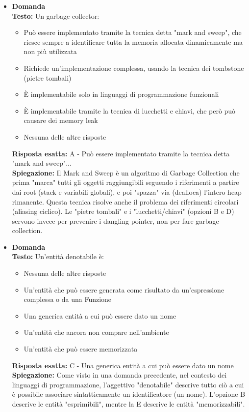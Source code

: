 \documentclass[12pt, a4paper]{article}
\newcounter{domandateoria}
\begin{document}
\begin{itemize}
    \item {}\textbf{Domanda \thedomandateoria} \\
    \textbf{Testo:} Un garbage collector:
    \begin{itemize}
        \item[A)] Può essere implementato tramite la tecnica detta "mark and sweep", che riesce sempre a identificare tutta la memoria allocata dinamicamente ma non più utilizzata
        \item[B)] Richiede un'implementazione complessa, usando la tecnica dei tombstone (pietre tombali)
        \item[C)] È implementabile solo in linguaggi di programmazione funzionali
        \item[D)] È implementabile tramite la tecnica di lucchetti e chiavi, che però può causare dei memory leak
        \item[E)] Nessuna delle altre risposte
    \end{itemize}
    \textbf{Risposta esatta:} A - Può essere implementato tramite la tecnica detta "mark and sweep"... \\
    \textbf{Spiegazione:} Il Mark and Sweep è un algoritmo di Garbage Collection che prima "marca" tutti gli oggetti raggiungibili seguendo i riferimenti a partire dai root (stack e variabili globali), e poi "spazza" via (dealloca) l'intero heap rimanente. Questa tecnica risolve anche il problema dei riferimenti circolari (aliasing ciclico). Le "pietre tombali" e i "lucchetti/chiavi" (opzioni B e D) servono invece per prevenire i dangling pointer, non per fare garbage collection.
    \vspace{0.3cm}

    \item {}\textbf{Domanda \thedomandateoria} \\
    \textbf{Testo:} Un'entità denotabile è:
    \begin{itemize}
        \item[A)] Nessuna delle altre risposte
        \item[B)] Un'entità che può essere generata come risultato da un'espressione complessa o da una Funzione
        \item[C)] Una generica entità a cui può essere dato un nome
        \item[D)] Un'entità che ancora non compare nell'ambiente
        \item[E)] Un'entità che può essere memorizzata
    \end{itemize}
    \textbf{Risposta esatta:} C - Una generica entità a cui può essere dato un nome \\
    \textbf{Spiegazione:} Come visto in una domanda precedente, nel contesto dei linguaggi di programmazione, l'aggettivo "denotabile" descrive tutto ciò a cui è possibile associare sintatticamente un identificatore (un nome). L'opzione B descrive le entità "esprimibili", mentre la E descrive le entità "memorizzabili".
    \vspace{0.3cm}


\end{itemize}
\end{document}
